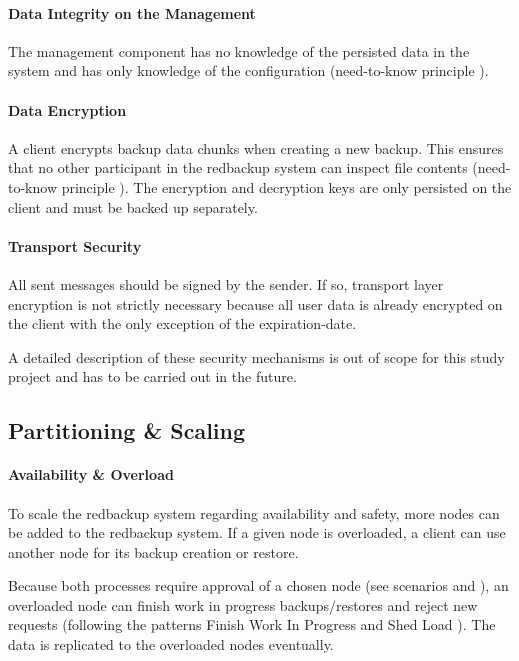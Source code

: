 \paragraph{Data Integrity on the Management} The \gls{management} component has no knowledge of the persisted data in the system and has only knowledge of the configuration (need-to-know principle \cite{security-patterns}).

\paragraph{Data Encryption} A \gls{client} encrypts backup data \glspl{chunk} when creating a new backup. This ensures that no other participant in the redbackup system can inspect file contents (need-to-know principle \cite{security-patterns}). The encryption and decryption keys are only persisted on the \gls{client} and must be backed up separately.

\paragraph{Transport Security} All sent \glspl{message} should be signed by the sender. If so, transport layer encryption is not strictly necessary because all user data is already encrypted on the \gls{client} with the only exception of the \gls{expiration-date}.

A detailed description of these security mechanisms is out of scope for this study project and has to be carried out in the future.

\subsection{Partitioning \& Scaling}

\paragraph{Availability \& Overload} To scale the redbackup system regarding availability and safety, more \glspl{node} can be added to the redbackup system. If a given \gls{node} is overloaded, a \gls{client} can use another \gls{node} for its backup creation or restore.

Because both processes require approval of a chosen \gls{node} (see scenarios  and ), an overloaded \gls{node} can finish work in progress backups/restores and reject new requests (following the patterns Finish Work In Progress and Shed Load \cite{fault-tolerance}). The data is replicated to the overloaded \glspl{node} eventually.

